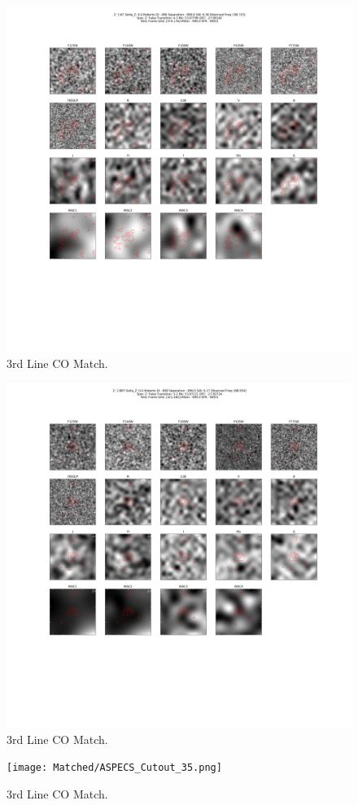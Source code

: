 \begin{figure}[tbp]
\centering \includegraphics[width=120mm]{Matched/ASPECS_Cutout_33.png}
\caption{3rd Line CO Match.}
\label{fig:Match_Three}
\end{figure}

\begin{figure}[tbp]
\centering \includegraphics[width=120mm]{Matched/ASPECS_Cutout_34.png}
\caption{3rd Line CO Match.}
\label{fig:Match_Three}
\end{figure}

\begin{figure}[tbp]
\centering \texttt{[image: Matched/ASPECS\_Cutout\_35.png]}
\caption{3rd Line CO Match.}
\label{fig:Match_Three}
\end{figure}

